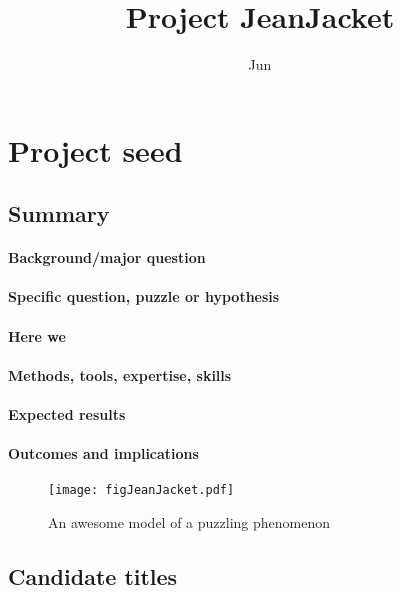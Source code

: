 \documentclass[onecolumn,11pt]{article}
\title{Project JeanJacket}
\author[a]{Jun}
\affil[a]{University of California Irvine}
\date{} %
\begin{document}
\maketitle



\section{Project seed}

\subsection*{Summary}
\paragraph{Background/major question} \lipsum[2]
\paragraph{Specific question, puzzle or hypothesis}\lipsum[2]
\paragraph{Here we}\lipsum[2]
\paragraph{Methods, tools, expertise, skills}\lipsum[2]
\paragraph{Expected results}\lipsum[2]
\paragraph{Outcomes and implications}\lipsum[2]


\begin{figure}[h!]
\centering
\texttt{[image: figJeanJacket.pdf]}
\caption{An awesome model of a puzzling phenomenon}
\label{fig:JeanJacketSchematic}
\end{figure}

\subsection{Candidate titles}
\end{document}
